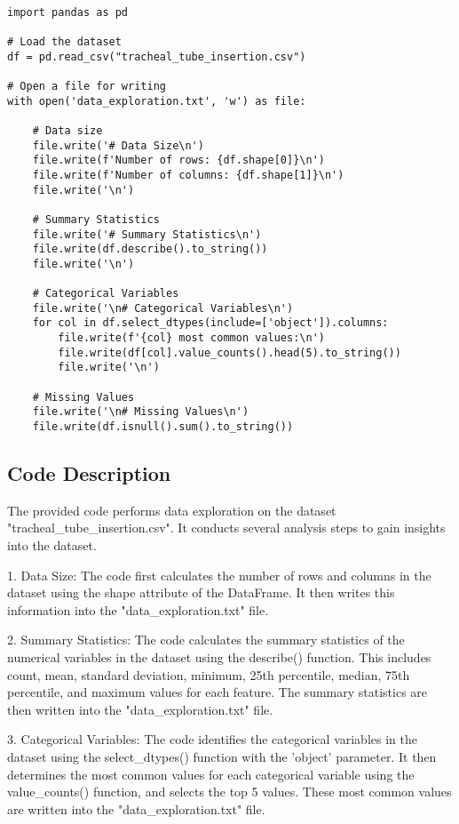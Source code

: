 \documentclass[11pt]{article}
\begin{document}
\begin{verbatim}

import pandas as pd

# Load the dataset
df = pd.read_csv("tracheal_tube_insertion.csv")

# Open a file for writing
with open('data_exploration.txt', 'w') as file:

    # Data size
    file.write('# Data Size\n')
    file.write(f'Number of rows: {df.shape[0]}\n')
    file.write(f'Number of columns: {df.shape[1]}\n')
    file.write('\n')

    # Summary Statistics
    file.write('# Summary Statistics\n')
    file.write(df.describe().to_string())
    file.write('\n')

    # Categorical Variables
    file.write('\n# Categorical Variables\n')
    for col in df.select_dtypes(include=['object']).columns:
        file.write(f'{col} most common values:\n')
        file.write(df[col].value_counts().head(5).to_string())
        file.write('\n')

    # Missing Values
    file.write('\n# Missing Values\n')
    file.write(df.isnull().sum().to_string())

\end{verbatim}

\subsection{Code Description}

The provided code performs data exploration on the dataset "tracheal\_tube\_insertion.csv". It conducts several analysis steps to gain insights into the dataset.

1. Data Size:
   The code first calculates the number of rows and columns in the dataset using the shape attribute of the DataFrame. It then writes this information into the "data\_exploration.txt" file.

2. Summary Statistics:
   The code calculates the summary statistics of the numerical variables in the dataset using the describe() function. This includes count, mean, standard deviation, minimum, 25th percentile, median, 75th percentile, and maximum values for each feature. The summary statistics are then written into the "data\_exploration.txt" file.

3. Categorical Variables:
   The code identifies the categorical variables in the dataset using the select\_dtypes() function with the 'object' parameter. It then determines the most common values for each categorical variable using the value\_counts() function, and selects the top 5 values. These most common values are written into the "data\_exploration.txt" file.
\end{document}
